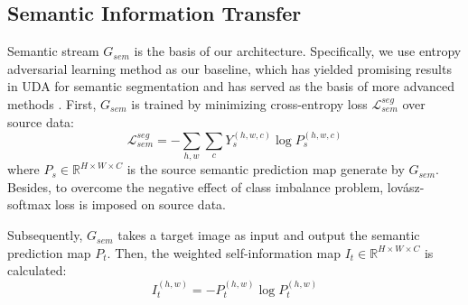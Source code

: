 \documentclass[sigconf]{acmart}
\begin{document}
\subsection{Semantic Information Transfer}
\par Semantic stream $G_{sem}$ is the basis of our architecture. Specifically, we use entropy adversarial learning method as our baseline, which has yielded promising results in UDA for semantic segmentation \cite{vu2019advent} and has served as the basis of more advanced methods \cite{vu2019dada,pan2020unsupervised}. First, $G_{sem}$ is trained by minimizing cross-entropy loss $\mathcal{L}_{sem}^{seg}$ over source data:
\begin{equation}
    \mathcal{L}_{sem}^{seg}=-\sum_{h, w} \sum_{c} Y_{s}^{(h, w, c)} \log P_{s}^{(h, w, c)}
\label{eq:0}
\end{equation}
where $P_{s}\in \mathbb{R}^{H \times W \times C}$ is the source semantic prediction map generate by $G_{sem}$. Besides, to overcome the negative effect of class imbalance problem, lov{\'a}sz-softmax loss \cite{berman2018lovasz} is imposed on source data.

\par Subsequently, $G_{sem}$ takes a target image as input and output the semantic prediction map $P_{t}$. Then, the weighted self-information map $I_{t} \in \mathbb{R}^{H \times W \times C}$ is calculated:
\begin{equation}
    I_{t}^{(h, w)}=-P_{t}^{(h, w)} \log P_{t}^{(h, w)}
\label{eq:1}
\end{equation}
\end{document}

